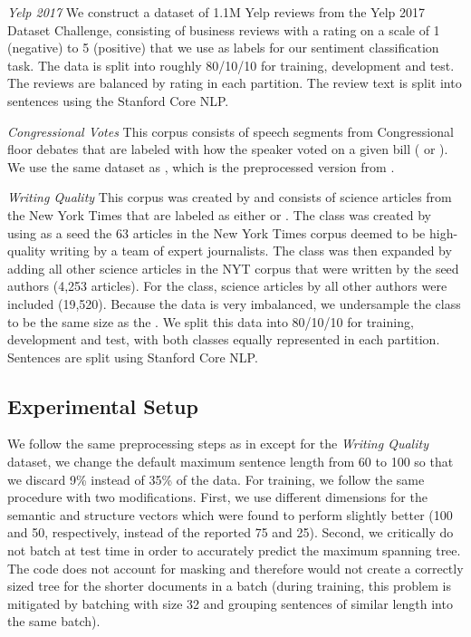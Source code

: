 \smallskip
\noindent\emph{Yelp 2017} We construct a dataset of 1.1M Yelp reviews from the Yelp 2017 Dataset Challenge, consisting of business reviews with a rating on a scale of 1 (negative) to 5 (positive) that we use as labels for our sentiment classification task. The data is split into roughly 80/10/10 for training, development and test. The reviews are balanced by rating in each partition. The review text is split into sentences using the Stanford Core NLP.


\smallskip
\noindent\emph{Congressional Votes} This corpus consists of speech segments from Congressional floor debates that are labeled with how the speaker voted on a given bill ( or ). We use the same dataset as , which is the preprocessed version from . 


\smallskip
\noindent\emph{Writing Quality} This corpus was created by  and consists of science articles from the New York Times that are labeled as either  or . The  class was created by using as a seed the 63 articles in the New York Times corpus \cite{Sandhaus:2008} deemed to be high-quality writing  by a team of expert journalists. The class was then expanded by adding all other science articles in the NYT corpus that were written by the seed authors (4,253 articles). For the  class, science articles by all other authors were included (19,520). Because the data is very imbalanced, we undersample the  class to be the same size as the . We split this data into 80/10/10 for training, development and test, with both classes equally represented in each partition. Sentences are split using Stanford Core NLP.

\subsection{Experimental Setup}
We follow the same preprocessing steps as in  except for the \emph{Writing Quality} dataset, we change the default maximum sentence length from 60 to 100 so that we discard 9\% instead of 35\% of the data. For training, we follow the same procedure with two modifications. First, we use different dimensions for the semantic and structure vectors which were found to perform slightly better (100 and 50, respectively, instead of the reported 75 and 25). Second, we critically do not batch at test time in order to accurately predict the maximum spanning tree. The code does not account for masking and therefore would not create a correctly sized tree for the shorter documents in a batch (during training, this problem is mitigated by batching with size 32 and grouping sentences of similar length into the same batch).

